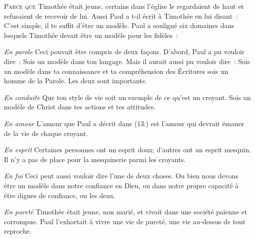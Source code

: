 \lettrine{P}{arce que} Timothée était jeune, certains dans l'église
 le regardaient de haut et refusaient de recevoir de lui.
 Aussi Paul a t-il écrit à Timothée en lui disant~: 
 \Og C'est simple, il te suffit d'être un modèle. \Fg{}
 Paul a souligné six domaines dans lesquels Timothée
 devait être un modèle pour les fidèles~:


\emph{En parole} \ocadr
 Ceci pouvait être compris de deux fa\c{c}ons.
 D'abord, Paul a pu vouloir dire~: 
 \Og Sois un modèle dans ton langage. \Fg{}
 Mais il aurait aussi pu vouloir dire~: 
 \Og Sois un modèle dans ta connaissance et ta compréhension des Écritures
 \ocadr sois un homme de la Parole. \Fg{} Les deux sont importants.

\emph{En conduite} \ocadr
 Que ton style de vie soit un exemple de ce qu'est un croyant.
 Sois un modèle de Christ dans tes actions et tes attitudes.

\emph{En amour} \ocadr
 L'amour que Paul a décrit dans (13:) 
 est l'amour qui devrait émaner de la vie de chaque croyant.

\emph{En esprit} \ocadr
 Certaines personnes ont un esprit doux; d'autres ont un esprit mesquin.
 Il n'y a pas de place pour la mesquinerie parmi les croyants.

\emph{En foi} \ocadr
 Ceci peut aussi vouloir dire l'une de deux choses.
 Ou bien nous devons être un modèle dans notre confiance en Dieu,
 ou dans notre propre capacité à être dignes de confiance, ou les deux.

\emph{En pureté} \ocadr
 Timothée était jeune, non marié, et vivait dans une société païenne
 et corrompue. Paul l'exhortait à vivre une vie de pureté,
 une vie au-dessus de tout reproche.



\dvrule





